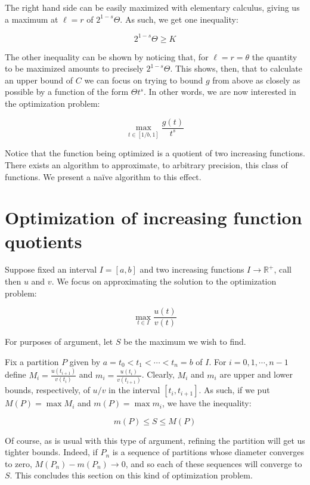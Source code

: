 \documentclass[11pt, reqno]{amsart}
\newcommand{\R}{\mathbb{R}}
\begin{document}
The right hand side can be easily maximized with elementary calculus, giving us a maximum at $\ell = r$ of $2^{1-s} \Theta$. As such, we get one inequality:

\[ 2^{1-s} \Theta \geq K \]

The other inequality can be shown by noticing that, for $\ell = r = \theta$ the quantity to be maximized amounts to precisely $2^{1-s} \Theta$. This shows, then, that to calculate an upper bound of $C$ we can focus on trying to bound $g$ from above as closely as possible by a function of the form $\Theta t^s$. In other words, we are now interested in the optimization problem:

\[ \max_{t \in \left[ 1/b, 1 \right]} \frac{g(t)}{t^s} \]

Notice that the function being optimized is a quotient of two increasing functions. There exists an algorithm to approximate, to arbitrary precision, this class of functions. We present a naïve algorithm to this effect.

\section{Optimization of increasing function quotients} \label{optimization}

Suppose fixed an interval $I = \left[ a, b \right]$ and two increasing functions $I \to \R^+$, call then $u$ and $v$. We focus on approximating the solution to the optimization problem:

\[ \max_{t \in I} \frac{u(t)}{v(t)} \]

For purposes of argument, let $S$ be the maximum we wish to find.

Fix a partition $P$ given by $a = t_0 < t_1 < \cdots < t_n = b$ of $I$. For $i = 0, 1, \cdots, n-1$ define $M_i = \frac{u(t_{i+1})}{v(t_i)}$ and $m_i = \frac{u(t_i)}{v(t_{i+1})}$. Clearly, $M_i$ and $m_i$ are upper and lower bounds, respectively, of $u/v$ in the interval $\left[t_i, t_{i+1} \right]$. As such, if we put $M(P) = \max M_i$ and $m(P) = \max m_i$, we have the inequality:

\[m(P) \leq S \leq M(P)\]

Of course, as is usual with this type of argument, refining the partition will get us tighter bounds. Indeed, if $P_n$ is a sequence of partitions whose diameter converges to zero, $M(P_n) - m(P_n) \to 0$, and so each of these sequences will converge to $S$. This concludes this section on this kind of optimization problem.
\end{document}
